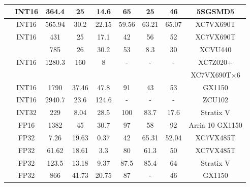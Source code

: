 \begin{table}[htbp]
\begin{tabular}{|r|c|c|c|c|c|c|c|c|}
            \cite{guan2017fp}           & INT16     & 364.4     & 25    & 14.6  & 65    & 25    & 46    & 5SGSMD5 \\ \hline
            \cite{li2016high}           & INT16     & 565.94    & 30.2  & 22.15 & 59.56 & 63.21 & 65.07 & XC7VX690T \\ \hline
            \multirow{2}[2]{*}{\cite{Shen2018Towards}} & \multirow{2}[2]{*}{INT16} & 431  & 25 & 17.1  & 42 & 56 & 52    & XC7VX690T \\ \cline{3-9}    
             &  & 785 & 26 & 30.2 & 53 & 8.3  & 30 & XCVU440 \\ \hline
            \multirow{2}[2]{*}{\cite{zhang2016energy}} & \multirow{2}[0]{*}{INT16} & \multirow{2}[0]{*}{1280.3} & \multirow{2}[0]{*}{160} & \multirow{2}[0]{*}{8} & \multirow{2}[0]{*}{-} & \multirow{2}[0]{*}{-} & \multirow{2}[0]{*}{-} & XC7Z020+ \\
            &       &       &       &       &       &       &       & XC7VX690T$\times$6 \\ \hline
            \cite{zhang2017improving}   & INT16     & 1790      & 37.46 & 47.8  & 91    & 43    & 53    & GX1150 \\ \hline
            \cite{lu2017evaluating}     & INT16     & 2940.7    & 23.6  & 124.6 &   -   &   -   &   -   & ZCU102 \\ \hline
            \cite{podili2017fast}       & INT32     & 229       & 8.04  & 28.5  & 100   & 83.7  & 17.6  & Stratix V \\ \hline
            \cite{aydonat2017opencl}    & FP16      & 1382      & 45    & 30.7  & 97    & 58    & 92    & Arria 10 GX1150 \bigstrut[t]\\ \hline
            \cite{guan2017fpga}         & FP32      & 7.26      & 19.63 & 0.37  & 42    & 65.31 & 52.04 & XC7VX485T \\ \hline
            \cite{zhang2015optimizing}  & FP32      & 61.62     & 18.61 & 3.3   & 80    & 61.3  & 50    & XC7VX485T \\ \hline
            \cite{zhang2017frequency}   & FP32      & 123.5     & 13.18 & 9.37  & 87.5  & 85.4  & 64    & Stratix V \\ \hline
            \cite{zhang2017improving}   & FP32      & 866       & 41.73 & 20.75 & 87    & -     & 46    & GX1150 \\ \hline
        \end{tabular}%
    \label{tab:hardware_list}%
  \end{table}%